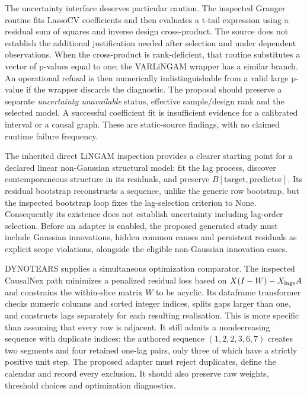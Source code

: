 The uncertainty interface deserves particular caution. The inspected
Granger routine fits LassoCV coefficients and then evaluates a t-tail
expression using a residual sum of squares and inverse design cross-product.
The source does not establish the additional justification needed after
selection and under dependent observations. When the cross-product is
rank-deficient, that routine substitutes a vector of p-values equal to one;
the VARLiNGAM wrapper has a similar branch. An operational refusal is then
numerically indistinguishable from a valid large p-value if the wrapper
discards the diagnostic. The proposal should preserve a separate
\emph{uncertainty unavailable} status, effective sample/design rank and
the selected model. A successful coefficient fit is insufficient evidence
for a calibrated interval or a causal graph. These are static-source
findings, with no claimed runtime failure frequency.
\citep{exec14_pt_causalai}

The inherited direct LiNGAM inspection provides a clearer starting point
for a declared linear non-Gaussian structural model: fit the lag process,
discover contemporaneous structure in its residuals, and preserve
$B[\text{target},\text{predictor}]$. Its residual bootstrap reconstructs
a sequence, unlike the generic row bootstrap, but the inspected bootstrap
loop fixes the lag-selection criterion to None. Consequently its existence
does not establish uncertainty including lag-order selection. Before an
adapter is enabled, the proposed generated study must include Gaussian
innovations, hidden common causes and persistent residuals as explicit
scope violations, alongside the eligible non-Gaussian innovation cases.
\citep{v131_sw_lingam,exec13_pydisc_lingam,exec14_pt_contract}

DYNOTEARS supplies a simultaneous optimization comparator. The inspected
CausalNex path minimizes a penalized residual loss based on
$X(I-W)-X_{\rm lags}A$ and constrains the within-slice matrix $W$ to be
acyclic. Its dataframe transformer checks numeric columns and sorted integer
indices, splits gaps larger than one, and constructs lags separately for
each resulting realisation. This is more specific than assuming that every
row is adjacent. It still admits a nondecreasing sequence with duplicate
indices: the authored sequence $(1,2,2,3,6,7)$ creates two segments and four
retained one-lag pairs, only three of which have a strictly positive unit
step. The proposed adapter must reject duplicates, define the calendar and
record every exclusion. It should also preserve raw weights, threshold
choices and optimization diagnostics.
\citep{exec14_pt_causalnex,exec14_pt_exact,exec14_pt_paper_dynotears}

